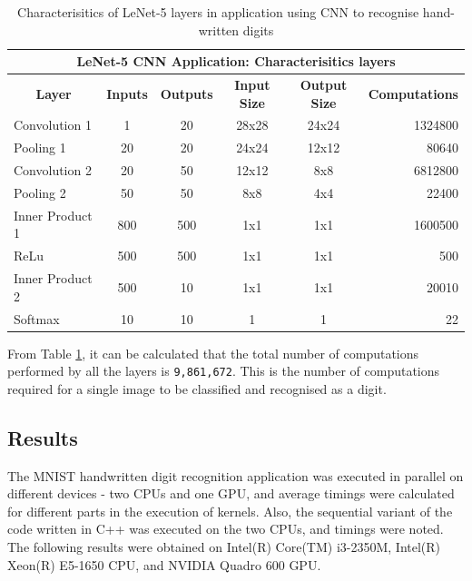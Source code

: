 \begin{table}[h!]
\centering
 \caption{Characterisitics of LeNet-5 layers in application using CNN to recognise hand-written digits}
 \vspace{3mm}
 \renewcommand\arraystretch{1.4}
 \begin{tabular}{ | m{7em} | c | c | c | c | r | }
 \hline
 \multicolumn{6}{|c|}{LeNet-5 CNN Application: Characterisitics layers} \\
 \hline
 \multicolumn{1}{|c|}{\bfseries Layer} & \multicolumn{1}{c|}{\bfseries Inputs} & \multicolumn{1}{c|}{\bfseries Outputs} & \multicolumn{1}{c|}{\bfseries Input Size} & \multicolumn{1}{c|}{\bfseries Output Size} & \multicolumn{1}{c|}{\bfseries Computations} \\
 \hline
 Convolution 1 & 1 & 20 & 28x28 & 24x24 & 1324800 \\
 \hline
 Pooling 1 & 20 & 20 & 24x24 & 12x12 & 80640 \\
 \hline
 Convolution 2 & 20 & 50 & 12x12 & 8x8 & 6812800 \\ 
 \hline
 Pooling 2 & 50 & 50 & 8x8 & 4x4 & 22400 \\
 \hline
 Inner Product 1 & 800 & 500 & 1x1 & 1x1 & 1600500 \\
 \hline
 ReLu & 500 & 500 & 1x1 & 1x1 & 500 \\
 \hline
 Inner Product 2 & 500 & 10 & 1x1 & 1x1 & 20010 \\
 \hline
 Softmax & 10 & 10 &  1 & 1 & 22 \\
 \hline
 \end{tabular}
 \label{table:mnist_layers_comp}
\end{table}
From Table \ref{table:mnist_layers_comp}, it can be calculated that the total number of computations performed by all the layers is \verb|9,861,672|. This is the number of computations required for a single image to be classified and recognised as a digit.

\subsection{Results}
\label{sect5_3_2}
The MNIST handwritten digit recognition application was executed in parallel on different devices - two CPUs and one GPU, and average timings were calculated for different parts in the execution of kernels. Also, the sequential variant of the code written in C++ was executed on the two CPUs, and timings were noted. \newline\newline
The following results were obtained on Intel(R) Core(TM) i3-2350M, Intel(R) Xeon(R) E5-1650 CPU, and NVIDIA Quadro 600 GPU.

